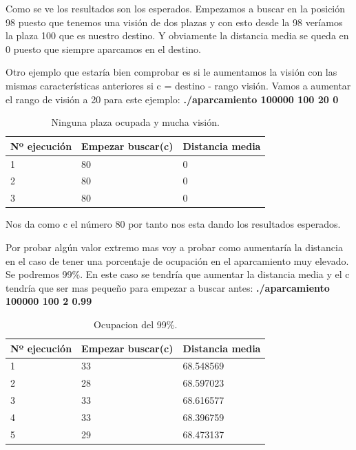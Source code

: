 \documentclass[]{article}
\begin{document}
Como se ve los resultados son los esperados. Empezamos a buscar en la posición 98 puesto que tenemos una visión de dos plazas y con esto desde la 98 veríamos la plaza 100 que es nuestro destino. Y obviamente la distancia media se queda en 0 puesto que siempre aparcamos en el destino. 

Otro ejemplo que estaría bien comprobar es si le aumentamos la visión con las mismas características anteriores si c = destino - rango visión. Vamos a aumentar el rango de visión a 20 para este ejemplo: 
\textbf{./aparcamiento 100000 100 20 0 }
 
 \begin{table}[htbp]
	\begin{center}
		\begin{tabular}{|l|l|l|}
			\hline
			Nº ejecución & Empezar buscar(c) & Distancia media \\
			\hline \hline
			1 & 80&0
			\\ \hline
			2 & 80&0
			\\ \hline
			3 & 80&0
			\\ \hline
		\end{tabular}
		\caption{Ninguna plaza ocupada y mucha visión.}
		\label{tabla:sencilla}
	\end{center}
\end{table}
 
Nos da como c el número 80 por tanto nos esta dando los resultados esperados. 

Por probar algún valor extremo mas voy a probar como aumentaría la distancia en el caso de tener una porcentaje de ocupación en el aparcamiento muy elevado. Se podremos 99\%. En este caso se tendría que aumentar la distancia media y el c tendría que ser mas pequeño para empezar a buscar antes:
\textbf{./aparcamiento 100000 100 2 0.99}
 \begin{table}[htbp]
	\begin{center}
		\begin{tabular}{|l|l|l|}
			\hline
			Nº ejecución & Empezar buscar(c) & Distancia media \\
			\hline \hline
			1 & 33&68.548569
			\\ \hline
			2 & 28&68.597023
			\\ \hline
			3 & 33&68.616577
			\\ \hline
			4 & 33&68.396759
			\\ \hline
			5 & 29&68.473137
			\\ \hline
		\end{tabular}
		\caption{Ocupacion del 99\%.}
		\label{tabla:sencilla}
	\end{center}
\end{table}
\end{document}
